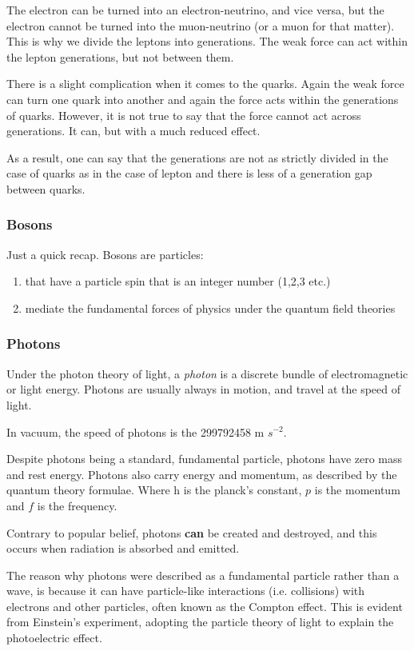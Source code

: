 The electron can be turned into an electron-neutrino, and vice versa, but the electron cannot be turned into the muon-neutrino (or a muon for that matter). This is why we divide the leptons into generations. The weak force can act within the lepton generations, but not between them.

There is a slight complication when it comes to the quarks. Again the weak force can turn one quark into another and again the force acts within the generations of quarks. However, it is not true to say that the force cannot act across generations. It can, but with a much reduced effect.

As a result, one can say that the generations are not as strictly divided in the case of quarks as in the case of lepton and there is less of a generation gap between quarks.

\subsubsection{Bosons}
Just a quick recap. Bosons are particles:
\begin{enumerate}
\item that have a particle spin that is an integer number (1,2,3 etc.)
\item mediate the fundamental forces of physics under the quantum field theories
\end{enumerate}

\subsubsection{Photons}
Under the photon theory of light, a \emph{photon} is a discrete bundle of electromagnetic or light energy. Photons are usually always in motion, and travel at the speed of light.

In vacuum, the speed of photons is the 299792458 m $s^{-2}$.

Despite photons being a standard, fundamental particle, photons have zero mass and rest energy. Photons also carry energy and momentum, as described by the quantum theory formulae.
Where h is the planck's constant, $p$ is the momentum and $f$ is the frequency.

Contrary to popular belief, photons \textbf{can} be created and destroyed, and this occurs when radiation is absorbed and emitted.

The reason why photons were described as a fundamental particle rather than a wave, is because it can have particle-like interactions (i.e. collisions) with electrons and other particles, often known as the Compton effect. This is evident from Einstein's experiment, adopting the particle theory of light to explain the photoelectric effect.

